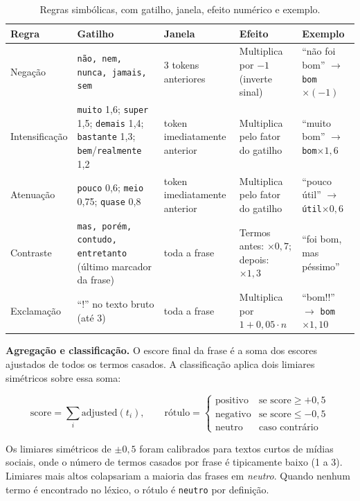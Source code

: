 \documentclass[11pt,a4paper]{article}
\newenvironment{addedblock}{\par\color{newblue}}{\par\color{black}}
\begin{document}
\begin{addedblock}
\begin{table}[h]
\small
\centering
\begin{tabularx}{\linewidth}{@{}L{1.9cm}L{3.1cm}L{1.9cm}L{2.6cm}Y@{}}
\toprule
\textbf{Regra} & \textbf{Gatilho} & \textbf{Janela} & \textbf{Efeito} & \textbf{Exemplo} \\
\midrule
Negação & \texttt{não, nem, nunca, jamais, sem} & 3 tokens anteriores & Multiplica por $-1$ (inverte sinal) & ``não foi bom'' $\rightarrow$ \texttt{bom}$\times(-1)$ \\
Intensificação & \texttt{muito} 1{,}6; \texttt{super} 1{,}5; \texttt{demais} 1{,}4; \texttt{bastante} 1{,}3; \texttt{bem}/\texttt{realmente} 1{,}2 & token imediatamente anterior & Multiplica pelo fator do gatilho & ``muito bom'' $\rightarrow$ \texttt{bom}$\times 1{,}6$ \\
Atenuação & \texttt{pouco} 0{,}6; \texttt{meio} 0{,}75; \texttt{quase} 0{,}8 & token imediatamente anterior & Multiplica pelo fator do gatilho & ``pouco útil'' $\rightarrow$ \texttt{útil}$\times 0{,}6$ \\
Contraste & \texttt{mas, porém, contudo, entretanto} (último marcador da frase) & toda a frase & Termos antes: $\times 0{,}7$; depois: $\times 1{,}3$ & ``foi bom, mas péssimo'' \\
Exclamação & ``!'' no texto bruto (até 3) & toda a frase & Multiplica por $1+0{,}05\cdot n$ & ``bom!!'' $\rightarrow$ \texttt{bom}$\times 1{,}10$ \\
\bottomrule
\end{tabularx}
\caption{Regras simbólicas, com gatilho, janela, efeito numérico e exemplo.}
\label{tab:regras}
\end{table}

\textbf{Agregação e classificação.}
O escore final da frase é a soma dos escores ajustados de todos os termos casados. A classificação aplica dois limiares simétricos sobre essa soma:

\begin{equation}
\text{score} = \sum_{i} \text{adjusted}(t_i), \qquad
\text{rótulo} =
\begin{cases}
\text{positivo} & \text{se } \text{score} \geq +0{,}5 \\
\text{negativo} & \text{se } \text{score} \leq -0{,}5 \\
\text{neutro}   & \text{caso contrário}
\end{cases}
\end{equation}

Os limiares simétricos de $\pm 0{,}5$ foram calibrados para textos curtos de mídias sociais, onde o número de termos casados por frase é tipicamente baixo (1 a 3). Limiares mais altos colapsariam a maioria das frases em \emph{neutro}. Quando nenhum termo é encontrado no léxico, o rótulo é \texttt{neutro} por definição.
\end{addedblock}
\end{document}
